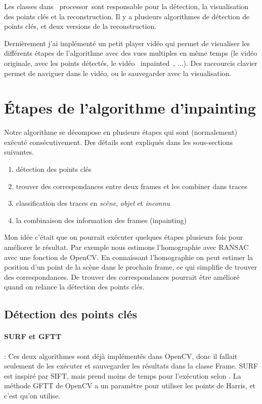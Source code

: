 \documentclass[8pt,twoside=off,titlepage=false, twocolumn]{scrartcl}
\begin{document}
Les classes dans \flqq\ processor\frqq\ sont responsable pour la détection, la visualisation des points clés et la reconstruction. Il y a plusieurs algorithmes de détection de points clés, et deux versions de la reconstruction.

Dernièrement j'ai implémenté un petit player vidéo qui permet de visualiser les différents étapes de l'algorithme avec des vues multiples en même temps (le vidéo originale, avec les points détectés, le vidéo \mbox{\flqq\ inpainted \frqq}, ...). Des raccourcis clavier permet de naviguer dans le vidéo, ou le sauvegarder avec la visualisation.

\section{Étapes de l'algorithme d'inpainting}

Notre algorithme se décompose en plusieurs étapes qui sont (normalement) exécuté consécutivement. Des détails sont expliqués dans les sous-sections suivantes.

\begin{enumerate}
\item détection des points clés
\item trouver des correspondances entre deux frames et les combiner dans traces
\item classification des traces en \emph{scène}, \emph{objet} et \emph{inconnu}
\item la combinaison des information des frames (inpainting)
\end{enumerate}

Mon idée c'était que on pourrait exécuter quelques étapes plusieurs fois pour améliorer le résultat. Par exemple nous estimons l'homographie avec RANSAC avec une fonction de OpenCV. En connaissant l'homographie on peut estimer la position d'un point de la scène dans le prochain frame, ce qui simplifie de trouver des correspondances. De trouver des correspondances pourrait être amélioré quand on relance la détection des points clés.

\subsection{Détection des points clés}

\paragraph{SURF et GFTT} : Ces deux algorithmes sont déjà implémentés dans OpenCV, donc il fallait seulement de les exécuter et sauvegarder les résultats dans la classe Frame. SURF est inspiré par SIFT, mais prend moins de temps pour l'exécution selon \cite{surf}. La méthode GFTT de OpenCV a un paramètre pour utiliser les points de Harris, et c'est qu'on utilise.
\end{document}
